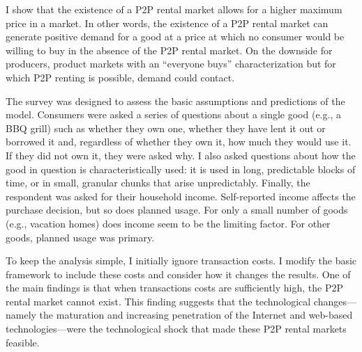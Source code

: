 \documentclass[11pt]{article}
\begin{document}
I show that the existence of a P2P rental market allows for a higher maximum price in a market. 
In other words, the existence of a P2P rental market can generate positive demand for a good at a price at which no consumer would be willing to buy in the absence of the P2P rental market. 
On the downside for producers, product markets with an ``everyone buys'' characterization but for which P2P renting is possible, demand could contact.   

The survey was designed to assess the basic assumptions and predictions of the model.
Consumers were asked a series of questions about a single good (e.g., a BBQ grill) such as whether they own one, whether they have lent it out or borrowed it and, regardless of whether they own it, how much they would use it. 
If they did not own it, they were asked why. 
I also asked questions about how the good in question is characteristically used: it is used in long, predictable blocks of time, or in small, granular chunks that arise unpredictably. 
Finally, the respondent was asked for their household income.  
Self-reported income affects the purchase decision, but so does planned usage. 
For only a small number of goods (e.g., vacation homes) does income seem to be the limiting factor. 
For other goods, planned usage was primary.  

To keep the analysis simple, I initially ignore transaction costs. 
I modify the basic framework to include these costs and consider how it changes the results. 
One of the main findings is that when transactions costs are sufficiently high, the P2P rental market cannot exist. 
This finding suggests that the technological changes---namely the maturation and increasing penetration of the Internet and web-based technologies---were the technological shock that made these P2P rental markets feasible. 
\end{document}
